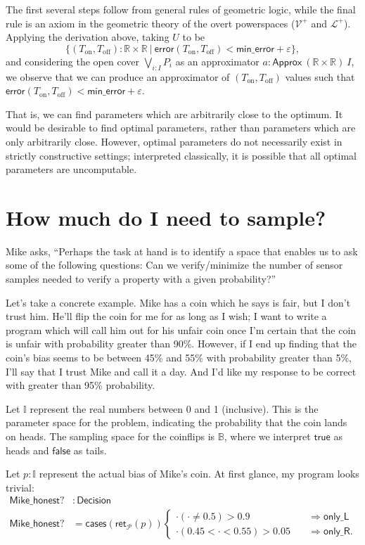 \documentclass{article}           %
\newcommand{\R}{\mathbb{R}}
\newcommand{\suchthat}{\ |\ }
\newcommand{\bool}{\mathbb{B}}
\newcommand{\Prob}{\mathcal{P}}
\newcommand{\PLower}{\mathcal{L}^+}
\newcommand{\Viet}{{\mathcal{V}^+}}
\newcommand{\ret}[1]{\mathsf{ret}_{#1}}
\begin{document}
The first several steps follow from general rules of geometric logic, while the final rule is an axiom in the geometric theory of the overt powerspaces ($\Viet$ and $\PLower$). Applying the derivation above, taking $U$ to be
\[
\{ (T_\text{on}, T_\text{off}) : \R \times \R \suchthat \mathsf{error}(T_\text{on}, T_\text{off}) < \mathsf{min\_error} + \varepsilon \},
\]
and considering the open cover $\bigvee_{i : I} P_i$ as an approximator $a : \mathsf{Approx}\ (\R \times \R)\ I$, we observe that we can produce an approximator of $(T_\text{on}, T_\text{off})$ values such that $\mathsf{error}(T_\text{on}, T_\text{off})  < \mathsf{min\_error} + \varepsilon$.

That is, we can find parameters which are arbitrarily close to the optimum. It would be desirable to find optimal parameters, rather than parameters which are only arbitrarily close. However, optimal parameters do not necessarily exist in strictly constructive settings; interpreted classically, it is possible that all optimal parameters are uncomputable.

\section{How much do I need to sample?}

Mike asks, ``Perhaps the task at hand is to identify a space that enables us to ask
some of the following questions: Can we verify/minimize the number of sensor samples needed to verify a property with a given probability?''

Let's take a concrete example. Mike has a coin which he says is fair, but I don't trust him. He'll flip the coin for me for as long as I wish; I want to write a program which will call him out for his unfair coin once I'm certain that the coin is unfair with probability greater than 90\%. However, if I end up finding that the coin's bias seems to be between 45\% and 55\% with probability greater than 5\%, I'll say that I trust Mike and call it a day. And I'd like my response to be correct with greater than 95\% probability.

Let $\mathbb{I}$ represent the real numbers between 0 and 1 (inclusive). This is the parameter space for the problem, indicating the probability that the coin lands on heads. The sampling space for the coinflips is $\bool$, where we interpret $\mathsf{true}$ as heads and $\mathsf{false}$ as tails.

Let $p : \mathbb{I}$ represent the actual bias of Mike's coin. At first glance, my program looks trivial:
\begin{align*}
\mathsf{Mike\_honest?} &: \mathsf{Decision}
\\ \mathsf{Mike\_honest?} &= \mathsf{cases}(\ret{\Prob}(p))
\begin{cases}
\cdot(\cdot \ne 0.5) > 0.9
  \quad &\Longrightarrow
   \mathsf{only\_L}
\\
\cdot(0.45 < \cdot < 0.55) > 0.05
  \quad &\Longrightarrow
   \mathsf{only\_R}.
\end{cases}
\end{align*}
\end{document}
